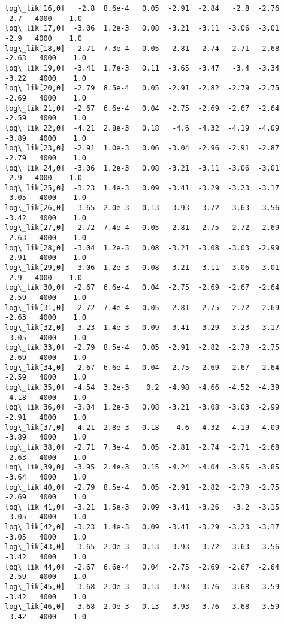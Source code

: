 \documentclass[11pt]{article}
\begin{document}
\begin{Verbatim}[commandchars=\\\{\}]
log\_lik[16,0]   -2.8  8.6e-4   0.05  -2.91  -2.84   -2.8  -2.76   -2.7   4000    1.0
log\_lik[17,0]  -3.06  1.2e-3   0.08  -3.21  -3.11  -3.06  -3.01   -2.9   4000    1.0
log\_lik[18,0]  -2.71  7.3e-4   0.05  -2.81  -2.74  -2.71  -2.68  -2.63   4000    1.0
log\_lik[19,0]  -3.41  1.7e-3   0.11  -3.65  -3.47   -3.4  -3.34  -3.22   4000    1.0
log\_lik[20,0]  -2.79  8.5e-4   0.05  -2.91  -2.82  -2.79  -2.75  -2.69   4000    1.0
log\_lik[21,0]  -2.67  6.6e-4   0.04  -2.75  -2.69  -2.67  -2.64  -2.59   4000    1.0
log\_lik[22,0]  -4.21  2.8e-3   0.18   -4.6  -4.32  -4.19  -4.09  -3.89   4000    1.0
log\_lik[23,0]  -2.91  1.0e-3   0.06  -3.04  -2.96  -2.91  -2.87  -2.79   4000    1.0
log\_lik[24,0]  -3.06  1.2e-3   0.08  -3.21  -3.11  -3.06  -3.01   -2.9   4000    1.0
log\_lik[25,0]  -3.23  1.4e-3   0.09  -3.41  -3.29  -3.23  -3.17  -3.05   4000    1.0
log\_lik[26,0]  -3.65  2.0e-3   0.13  -3.93  -3.72  -3.63  -3.56  -3.42   4000    1.0
log\_lik[27,0]  -2.72  7.4e-4   0.05  -2.81  -2.75  -2.72  -2.69  -2.63   4000    1.0
log\_lik[28,0]  -3.04  1.2e-3   0.08  -3.21  -3.08  -3.03  -2.99  -2.91   4000    1.0
log\_lik[29,0]  -3.06  1.2e-3   0.08  -3.21  -3.11  -3.06  -3.01   -2.9   4000    1.0
log\_lik[30,0]  -2.67  6.6e-4   0.04  -2.75  -2.69  -2.67  -2.64  -2.59   4000    1.0
log\_lik[31,0]  -2.72  7.4e-4   0.05  -2.81  -2.75  -2.72  -2.69  -2.63   4000    1.0
log\_lik[32,0]  -3.23  1.4e-3   0.09  -3.41  -3.29  -3.23  -3.17  -3.05   4000    1.0
log\_lik[33,0]  -2.79  8.5e-4   0.05  -2.91  -2.82  -2.79  -2.75  -2.69   4000    1.0
log\_lik[34,0]  -2.67  6.6e-4   0.04  -2.75  -2.69  -2.67  -2.64  -2.59   4000    1.0
log\_lik[35,0]  -4.54  3.2e-3    0.2  -4.98  -4.66  -4.52  -4.39  -4.18   4000    1.0
log\_lik[36,0]  -3.04  1.2e-3   0.08  -3.21  -3.08  -3.03  -2.99  -2.91   4000    1.0
log\_lik[37,0]  -4.21  2.8e-3   0.18   -4.6  -4.32  -4.19  -4.09  -3.89   4000    1.0
log\_lik[38,0]  -2.71  7.3e-4   0.05  -2.81  -2.74  -2.71  -2.68  -2.63   4000    1.0
log\_lik[39,0]  -3.95  2.4e-3   0.15  -4.24  -4.04  -3.95  -3.85  -3.64   4000    1.0
log\_lik[40,0]  -2.79  8.5e-4   0.05  -2.91  -2.82  -2.79  -2.75  -2.69   4000    1.0
log\_lik[41,0]  -3.21  1.5e-3   0.09  -3.41  -3.26   -3.2  -3.15  -3.05   4000    1.0
log\_lik[42,0]  -3.23  1.4e-3   0.09  -3.41  -3.29  -3.23  -3.17  -3.05   4000    1.0
log\_lik[43,0]  -3.65  2.0e-3   0.13  -3.93  -3.72  -3.63  -3.56  -3.42   4000    1.0
log\_lik[44,0]  -2.67  6.6e-4   0.04  -2.75  -2.69  -2.67  -2.64  -2.59   4000    1.0
log\_lik[45,0]  -3.68  2.0e-3   0.13  -3.93  -3.76  -3.68  -3.59  -3.42   4000    1.0
log\_lik[46,0]  -3.68  2.0e-3   0.13  -3.93  -3.76  -3.68  -3.59  -3.42   4000    1.0

\end{Verbatim}
\end{document}
